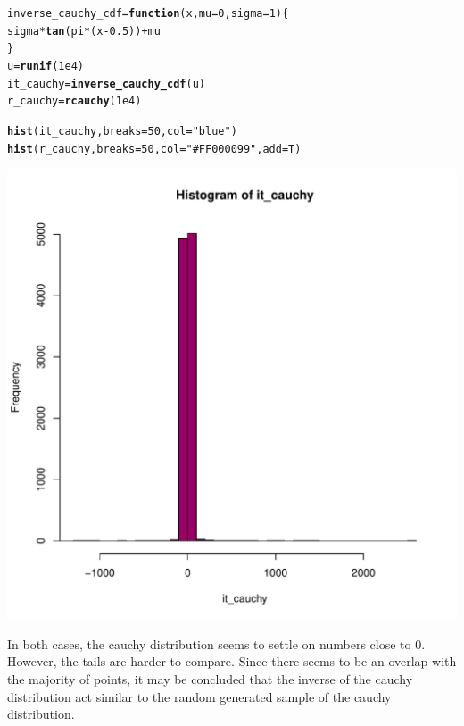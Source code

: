 \documentclass{article}\usepackage[]{graphicx}\usepackage[]{color}
\makeatletter
\newcommand{\hlnum}[1]{\textcolor[rgb]{0.686,0.059,0.569}{#1}}%
\newcommand{\hlstr}[1]{\textcolor[rgb]{0.192,0.494,0.8}{#1}}%
\newcommand{\hlopt}[1]{\textcolor[rgb]{0,0,0}{#1}}%
\newcommand{\hlstd}[1]{\textcolor[rgb]{0.345,0.345,0.345}{#1}}%
\newcommand{\hlkwa}[1]{\textcolor[rgb]{0.161,0.373,0.58}{\textbf{#1}}}%
\newcommand{\hlkwb}[1]{\textcolor[rgb]{0.69,0.353,0.396}{#1}}%
\newcommand{\hlkwc}[1]{\textcolor[rgb]{0.333,0.667,0.333}{#1}}%
\newcommand{\hlkwd}[1]{\textcolor[rgb]{0.737,0.353,0.396}{\textbf{#1}}}%
\newenvironment{kframe}{%
 \def\at@end@of@kframe{}%
 \ifinner\ifhmode%
  \def\at@end@of@kframe{\end{minipage}}%
  \begin{minipage}{\columnwidth}%
 \fi\fi%
 \def\FrameCommand##1{\hskip\@totalleftmargin \hskip-\fboxsep
 \colorbox{shadecolor}{##1}\hskip-\fboxsep
     \hskip-\linewidth \hskip-\@totalleftmargin \hskip\columnwidth}%
 \MakeFramed {\advance\hsize-\width
   \@totalleftmargin\z@ \linewidth\hsize
   \@setminipage}}%
 {\par\unskip\endMakeFramed%
 \at@end@of@kframe}
\newenvironment{knitrout}{}{} %
\makeatother
\begin{document}
\begin{knitrout}
\color{fgcolor}\begin{kframe}
\begin{alltt}
\hlstd{inverse_cauchy_cdf} \hlkwb{=} \hlkwa{function}\hlstd{(}\hlkwc{x}\hlstd{,} \hlkwc{mu} \hlstd{=} \hlnum{0}\hlstd{,} \hlkwc{sigma} \hlstd{=} \hlnum{1}\hlstd{)\{}
  \hlstd{sigma}\hlopt{*}\hlkwd{tan}\hlstd{(pi}\hlopt{*}\hlstd{(x}\hlopt{-}\hlnum{0.5}\hlstd{))} \hlopt{+} \hlstd{mu}
\hlstd{\}}
\hlstd{u} \hlkwb{=} \hlkwd{runif}\hlstd{(}\hlnum{1e4}\hlstd{)}
\hlstd{it_cauchy} \hlkwb{=} \hlkwd{inverse_cauchy_cdf}\hlstd{(u)}
\hlstd{r_cauchy} \hlkwb{=} \hlkwd{rcauchy}\hlstd{(}\hlnum{1e4}\hlstd{)}


\hlkwd{hist}\hlstd{(it_cauchy,} \hlkwc{breaks} \hlstd{=} \hlnum{50}\hlstd{,} \hlkwc{col} \hlstd{=} \hlstr{"blue"}\hlstd{)}
\hlkwd{hist}\hlstd{(r_cauchy,} \hlkwc{breaks} \hlstd{=} \hlnum{50}\hlstd{,} \hlkwc{col} \hlstd{=} \hlstr{"#FF000099"}\hlstd{,} \hlkwc{add} \hlstd{= T)}
\end{alltt}
\end{kframe}
\includegraphics[width=0.50\linewidth]{figure/unnamed-chunk-3-1} 

\end{knitrout}
In both cases, the cauchy distribution seems to settle on numbers close to 0. However, the tails are harder to compare. Since there seems to be an overlap with the majority of points, it may be concluded that the inverse of the cauchy distribution act similar to the random generated sample of the cauchy distribution.
\end{document}
